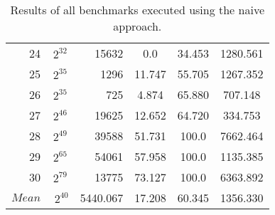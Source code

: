 \begin{table}[b!]
\begin{tabular}{rSrSSS}
    24 & {$2^{32}$} & 15632 & 0.0 & 34.453 & 1280.561  \\
    25 & {$2^{35}$} & 1296 & 11.747 & 55.705 & 1267.352 \\
    26 & {$2^{35}$} & 725 & 4.874 & 65.880 & 707.148 \\
    27 & {$2^{46}$} & 19625 & 12.652 & 64.720 & 334.753 \\
    28 & {$2^{49}$} & 39588 & 51.731 & 100.0 & 7662.464 \\
    29 & {$2^{65}$} & 54061 & 57.958 & 100.0 & 1135.385 \\
    30 & {$2^{79}$} & 13775 & 73.127 & 100.0 & 6363.892 \\	\midrule
	{$Mean$} & {$~2^{40}$} & 5440.067 & 17.208 & 60.345 & 1356.330 \\	\bottomrule
\end{tabular}
\caption{Results of all benchmarks executed using the naive approach.}
\label{tab:naive}
\end{table}

